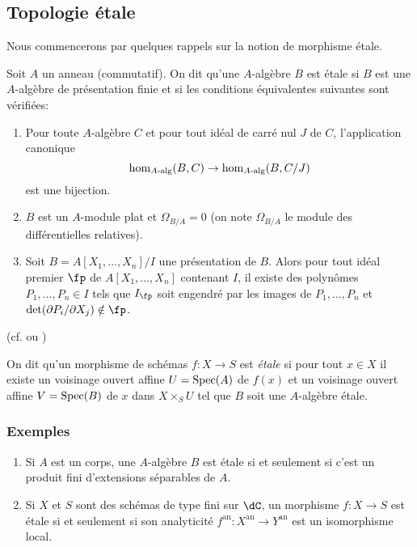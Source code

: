 \subsection{Topologie étale}\label{I:2-1}

Nous commencerons par quelques rappels sur la notion de morphisme étale. 

\begin{definition}\label{I:2-1-1}
Soit $A$ un anneau (commutatif). On dit qu'une $A$-algèbre $B$ est étale si 
$B$ est une $A$-algèbre de présentation finie et si les conditions 
équivalentes suivantes sont vérifiées:
\begin{enumerate}[\indent a)]
  \item Pour toute $A$-algèbre $C$ et pour tout idéal de carré nul $J$ de 
    $C$, l'application canonique 
    \[
      \hom_{A\textnormal{-alg}}(B,C) \to \hom_{A\textnormal{-alg}}(B,C/J)
    \]
    est une bijection.
  \item $B$ est un $A$-module plat et $\Omega_{B/A}=0$ (on note $\Omega_{B/A}$ 
    le module des différentielles relatives).
  \item Soit $B=A[X_1,\dotsc,X_n]/I$ une présentation de $B$. Alors pour tout 
    idéal premier $\fp$ de $A[X_1,\dotsc,X_n]$ contenant $I$, il existe des 
    polynômes $P_1,\dotsc,P_n\in I$ tels que $I_\fp$ soit engendré par les 
    images de $P_1,\dotsc,P_n$ et $\det(\partial P_i/\partial X_j)\notin \fp$.  
\end{enumerate}
\end{definition}
(cf. \cite[I]{sga1} ou \cite[V]{ra70})

On dit qu'un morphisme de schémas $f:X\to S$ est \emph{étale} si pour tout 
$x\in X$ il existe un voisinage ouvert affine $U=\operatorname{Spec}(A)$ de $f(x)$ et un 
voisinage ouvert affine $V=\operatorname{Spec}(B)$ de $x$ dans $X\times_S U$ tel que $B$ soit 
une $A$-algèbre étale. 





\subsubsection{Exemples}\label{I:2-1-2}
\begin{enumerate}[\indent a)]
  \item Si $A$ est un corps, une $A$-algèbre $B$ est étale si et seulement 
    si c'est un produit fini d'extensions séparables de $A$. 
  \item Si $X$ et $S$ sont des schémas de type fini sur $\dC$, un morphisme 
    $f:X\to S$ est étale si et seulement si son analyticité 
    $f^{\text{an}}:X^{\text{an}}\to Y^{\text{an}}$ est un isomorphisme local.
\end{enumerate}





